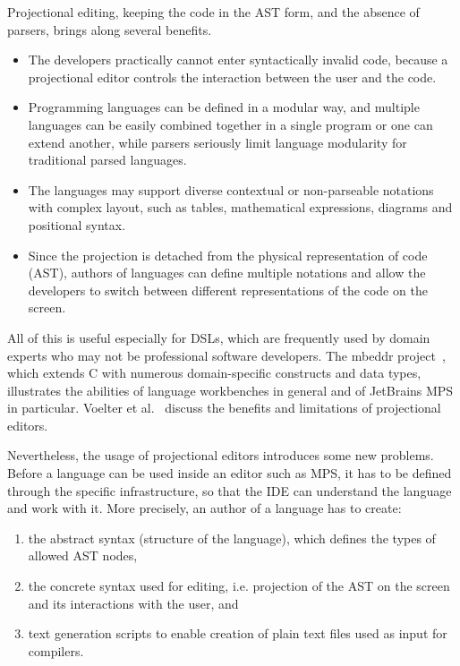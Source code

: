 Projectional editing, keeping the code in the AST form, and the absence of parsers, brings along several benefits.
\begin{itemize}
	\item The developers practically cannot enter syntactically invalid code, because a projectional editor controls the interaction between the user and the code.
	\item Programming languages can be defined in a modular way, and multiple languages can be easily combined together in a single program or one can extend another, while parsers seriously limit language modularity for traditional parsed languages.
	\item The languages may support diverse contextual or non-parseable notations with complex layout, such as tables, mathematical expressions, diagrams and positional syntax.
	\item Since the projection is detached from the physical representation of code (AST), authors of languages can define multiple notations and allow the developers to switch between different representations of the code on the screen.
\end{itemize}
All of this is useful especially for DSLs, which are frequently used by domain experts who may not be professional software developers.
The mbeddr project~\cite{ref:MBEDDR}, which extends C with numerous domain-specific constructs and data types, illustrates the abilities of language workbenches in general and of JetBrains MPS in particular.
Voelter et al.~\cite{ref:VSB14} discuss the benefits and limitations of projectional editors.

Nevertheless, the usage of projectional editors introduces some new problems.
Before a language can be used inside an editor such as MPS, it has to be defined through the specific infrastructure, so that the IDE can understand the language and work with it.
More precisely, an author of a language has to create:
\begin{enumerate}
	\item the abstract syntax (structure of the language), which defines the types of allowed AST nodes,
	\item the concrete syntax used for editing, i.e. projection of the AST on the screen and its interactions with the user, and
	\item text generation scripts to enable creation of plain text files used as input for compilers.
\end{enumerate}	

